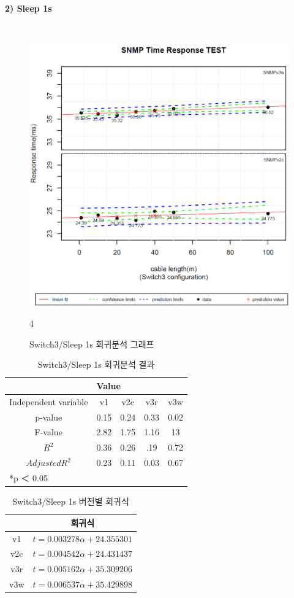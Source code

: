 \documentclass[11pt
  , a4paper
  , article
  , oneside
]{memoir}
\begin{document}
\clearpage
\paragraph{2) Sleep 1s}
   　
\begin{figure}[h!]
  \centering
  \includegraphics[width=0.5 \textwidth]{./images/s3s1.eps}
  \caption{Switch3/Sleep 1s 회귀분석 그래프}
4\end{figure}


\begin{table}[!htb]
\begin{center}
\begin{tabular}{c|c|c|c|c}\hline
& \multicolumn{4}{l}{Value} \\ \hline
Independent variable & v1 & v2c & v3r & v3w \\ \hline\hline
p-value& 0.15 & 0.24 & 0.33 & 0.02 \\ \hline
F-value& 2.82 & 1.75 & 1.16 & 13 \\ \hline
$  R^2  $ & 0.36 & 0.26 & .19 & 0.72  \\\hline
$ Adjusted R^2 $ & 0.23 & 0.11 & 0.03 & 0.67  \\\hline 
\multicolumn{5}{l}{*p ＜ 0.05} \\ \hline
\end{tabular}
\caption{Switch3/Sleep 1s 회귀분석 결과}
\end{center}
\end{table} 

\begin{table}[!htb]
\begin{center}
\begin{tabular}{c|c}\hline
 & 회귀식  \\ \hline\hline
v1 &  $ t=0.003278\alpha + 24.355301 $  \\ 
v2c & $ t=0.004542\alpha + 24.431437 $ \\ 
v3r & $ t=0.005162\alpha + 35.309206 $ \\ 
v3w & $ t=0.006537\alpha + 35.429898 $  \\ \hline
\end{tabular}
\caption{Switch3/Sleep 1s 버전별 회귀식}
\end{center}
\end{table} 
\end{document}
